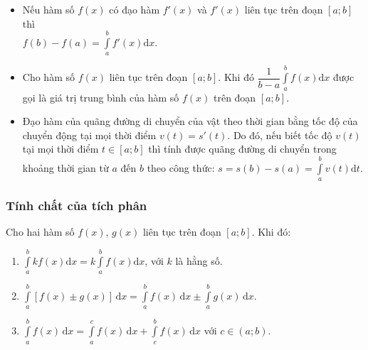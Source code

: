 \begin{nx}
	\begin{itemize}
		\item Nếu hàm số $f(x)$ có đạo hàm $f'(x)$ và $f'(x)$ liên tục trên đoạn $\left[a;b\right]$ thì\\
		$f(b)-f(a)=\displaystyle\int\limits_a^bf'(x)\mathrm{d}x$.
		\item Cho hàm số $f(x)$ liên tục trên đoạn $\left[a;b\right]$. Khi đó $\dfrac{1}{b-a}\displaystyle\int\limits_a^bf(x)\mathrm{d}x$ được gọi là giá trị trung bình của hàm số $f(x)$ trên đoạn $\left[a;b\right]$.
		\item Đạo hàm của quãng đường di chuyển của vật theo thời gian bằng tốc độ của chuyển động tại mọi thời điểm $v(t)=s'(t)$. Do đó, nếu biết tốc độ $v(t)$ tại mọi thời điểm $t\in\left[a;b\right]$ thì tính được quãng đường di chuyển trong khoảng thời gian từ $a$ đến $b$ theo công thức: $s=s(b)-s(a)=\displaystyle\int\limits_a^bv(t)\mathrm{d}t$.
	\end{itemize}
\end{nx}
\subsubsection{Tính chất của tích phân}
Cho hai hàm số $f(x)$, $g(x)$ liên tục trên đoạn $\left[a;b\right]$. Khi đó:
\begin{enumerate}
	\item $\displaystyle\int\limits_a^bkf(x)\mathrm{d}x=k\displaystyle\int\limits_a^bf(x)\mathrm{d}x$, với $k$ là hằng số.
	\item $\displaystyle\int\limits_a^b\left[f(x)\pm g(x)\right]\mathrm{\,d}x=\displaystyle\int\limits_a^b{f(x)\mathrm{\,d}x}\pm\displaystyle\int\limits_a^bg(x)\mathrm{\,d}x$.
	\item $\displaystyle\int\limits_a^bf(x)\mathrm{\,d}x=\displaystyle\int\limits_a^cf(x)\mathrm{\,d}x+\displaystyle\int\limits_c^bf(x)\mathrm{\,d}x$ với $c\in\left(a;b\right)$.
\end{enumerate}
